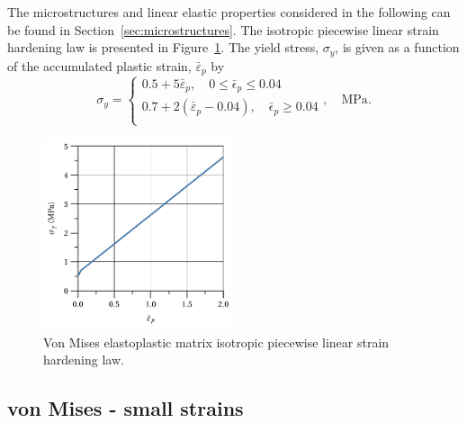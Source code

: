 The microstructures and linear elastic properties considered in the following can be found in Section~\ref{sec:microstructures}.
The isotropic piecewise linear strain hardening law is presented in Figure~\ref{fig:von_mises_res_mat_small_strain_2D_normal_hardening_curve}.
The yield stress, \(\sigma_y\), is given as a function of the accumulated plastic strain, \(\bar{\varepsilon}_p\) by
\begin{equation}
\label{von_mises_hardening_curve}
  \sigma_y = \begin{cases}
    0.5 + 5\bar{\varepsilon}_p,\quad 0 \leq \bar{\epsilon}_p \leq 0.04\\
    0.7 + 2(\bar{\varepsilon}_p-0.04),\quad \bar{\epsilon}_p \geq 0.04\\
  \end{cases},\quad\si{\mega\pascal}.
\end{equation}

\begin{figure}[hbt]
  \centering
  \includegraphics[width=0.5\textwidth]{figures/von_mises_res_mat_small_strain_2D_normal_hardening_curve}
  \caption{Von Mises elastoplastic matrix isotropic piecewise linear strain hardening law.}
\label{fig:von_mises_res_mat_small_strain_2D_normal_hardening_curve}
\end{figure}

\subsection{von Mises - small strains}

